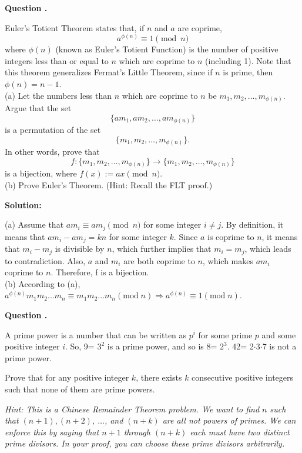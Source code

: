 \documentclass[12pt]{article}
\newcounter{questionnumber}
\newenvironment{question}[1][]{\stepcounter{questionnumber}\par\noindent\textbf{Question \thequestionnumber. #1}\par}{\par}
\newenvironment{solution}{\par\noindent\textbf{Solution:}\par}{\par\vspace{1em}}
\begin{document}
\begin{question}
    Euler's Totient Theorem states that, if $n$ and $a$ are coprime,
    $$a^{\phi(n)} \equiv 1 \pmod{n}$$
    where $\phi(n)$ (known as Euler's Totient Function) is the number of positive integers less than or equal to $n$ which are coprime to $n$ (including 1). Note that this theorem generalizes Fermat's Little Theorem, since if $n$ is prime, then $\phi(n) = n - 1$.\\
    (a) Let the numbers less than $n$ which are coprime to $n$ be $m_1, m_2, \ldots, m_{\phi(n)}$. Argue that the set
    $$\{am_1, am_2, \ldots, am_{\phi(n)}\}$$
    is a permutation of the set
    $$\{m_1, m_2, \ldots, m_{\phi(n)}\}.$$
    In other words, prove that
    $$f : \{m_1, m_2, \ldots, m_{\phi(n)}\} \to \{m_1, m_2, \ldots, m_{\phi(n)}\}$$
    is a bijection, where $f(x) := ax \pmod{n}$.\\
    (b) Prove Euler's Theorem. (Hint: Recall the FLT proof.)
\end{question}
\begin{solution}
    \noindent
    (a) Assume that $am_i\equiv am_j\pmod{n}$ for some integer $i\neq j$.
    By definition, it means that $am_i-am_j=kn$ for some integer $k$.
    Since $a$ is coprime to $n$, it means that $m_i-m_j$ is divisible by $n$, which further implies that $m_i=m_j$, which leads to contradiction.
    Also, $a$ and $m_i$ are both coprime to $n$, which makes $am_i$ coprime to $n$.
    Therefore, f is a bijection.\\
    (b) According to (a), $a^{\phi \left( n \right)}m_1m_2...m_n\equiv m_1m_2...m_n\left( \mathrm{mod}\;n \right) \Longrightarrow a^{\phi \left( n \right)}\equiv 1\left( \mathrm{mod}\;n \right) $.
\end{solution}
\begin{question}
    A prime power is a number that can be written as $p^i$ for some prime $p$ and some positive integer $i.$
    So, 9= $3^2$ is a prime power, and so is 8= $2^3$. 42= 2$\cdot$3$\cdot$7 is not a prime power. 

    Prove that for any positive integer $k$, there exists $k$ consecutive positive integers such that none of
    them are prime powers.

    \textit{Hint: This is a Chinese Remainder Theorem problem. We want to find $n$ such that $(n+1),(n+2)$, $\ldots$, and $(n+k)$ are all not powers of primes. We can enforce this by saying that $n+1$ through $(n+k)$ each must have two distinct prime divisors. In your proof, you can choose these prime divisors arbitrarily.}
\end{question}
\end{document}
